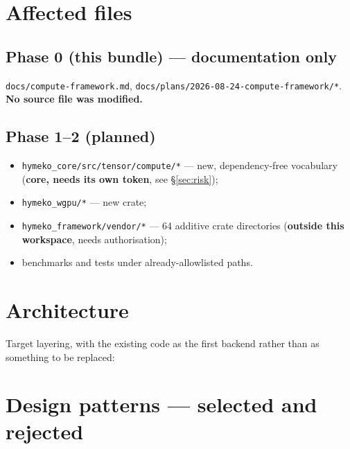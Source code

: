 \documentclass[11pt,a4paper]{article}
\begin{document}
\section{Affected files}

\subsection*{Phase 0 (this bundle) --- documentation only}
\texttt{docs/compute-framework.md}, \texttt{docs/plans/2026-08-24-compute-framework/*}.
\textbf{No source file was modified.}

\subsection*{Phase 1--2 (planned)}
\begin{itemize}
  \item \texttt{hymeko\_core/src/tensor/compute/*} --- new, dependency-free
        vocabulary (\textbf{core, needs its own token}, see \S\ref{sec:risk});
  \item \texttt{hymeko\_wgpu/*} --- new crate;
  \item \texttt{hymeko\_framework/vendor/*} --- 64 additive crate directories
        (\textbf{outside this workspace}, needs authorisation);
  \item benchmarks and tests under already-allowlisted paths.
\end{itemize}

\section{Architecture}

Target layering, with the existing code as the first backend rather than as
something to be replaced:



\section{Design patterns --- selected and rejected}
\end{document}
